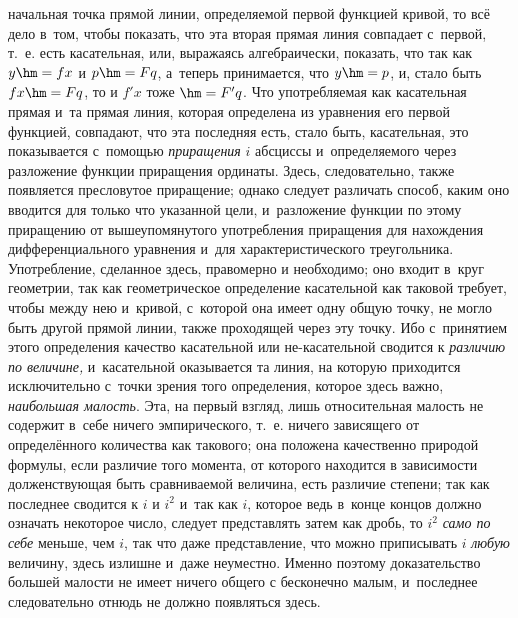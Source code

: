 начальная точка прямой линии, определяемой первой функцией кривой, то всё дело
в~том, чтобы показать, что эта вторая прямая линия совпадает с~первой, т.~е.
есть касательная, или, выражаясь алгебраически, показать, что так как $y\hm=fx$
и $p\hm=Fq$, а~теперь принимается, что $y\hm=p$, и, стало быть $fx\hm=Fq$, то и
$f'x$ тоже $\hm=F'q$. Что употребляемая как касательная прямая и~та прямая
линия, которая определена из уравнения его первой функцией, совпадают, что эта
последняя есть, стало быть, касательная, это показывается с~помощью
{\em приращения} $i$ абсциссы и~определяемого через разложение функции
приращения ординаты. Здесь, следовательно, также появляется пресловутое
приращение; однако следует различать способ, каким оно вводится для только что
указанной цели, и~разложение функции по этому приращению от вышеупомянутого
употребления приращения для нахождения дифференциального уравнения и~для
характеристического треугольника. Употребление, сделанное здесь, правомерно и
необходимо; оно входит в~круг геометрии, так как геометрическое определение
касательной как таковой требует, чтобы между нею и~кривой, с~которой она имеет
одну общую точку, не могло быть другой прямой линии, также проходящей через эту
точку. Ибо с~принятием этого определения качество касательной или
не-касательной сводится к {\em различию по величине,} и~касательной оказывается
та линия, на которую приходится исключительно с~точки зрения того определения,
которое здесь важно, {\em наибольшая малость}. Эта, на первый взгляд, лишь
относительная малость не содержит в~себе ничего эмпирического, т.~е. ничего
зависящего от определённого количества как такового; она положена качественно
природой формулы, если различие того момента, от которого находится в
зависимости долженствующая быть сравниваемой величина, есть различие степени;
так как последнее сводится к $i$ и $i^{2}$ и~так как $i$, которое ведь в~конце
концов должно означать некоторое число, следует представлять затем как дробь,
то $i^2$ {\em само по себе} меньше, чем $i$, так что даже представление, что
можно приписывать $i$ {\em любую} величину, здесь излишне и~даже неуместно.
Именно поэтому доказательство большей малости не имеет ничего общего с
бесконечно малым, и~последнее следовательно отнюдь не должно появляться здесь.

